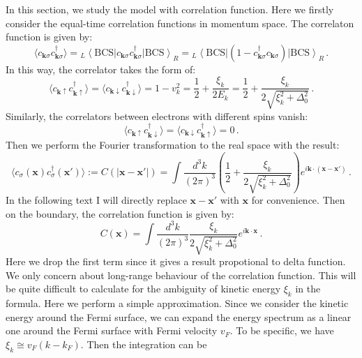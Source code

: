 \documentclass[aps,onecolumn,nofootinbib,superscriptaddress,notitlepage,longbibliography]{revtex4-1}
\begin{document}
In this section, we study the model with correlation function. Here
we firstly consider the equal-time correlation functions in momentum
space. The correlaton function is given by: 
\begin{equation}
\langle c_{\bm{k}\sigma}c_{\bm{k}\sigma}^{\dagger}\rangle={}_{L}\left\langle \text{BCS}\right|c_{\bm{k}\sigma}c_{\bm{k}\sigma}^{\dagger}\left|\text{BCS}\right\rangle _{R}={}_{L}\left\langle \text{BCS}\right|(1-c_{\bm{k}\sigma}^{\dagger}c_{\bm{k}\sigma})\left|\text{BCS}\right\rangle _{R}\,.
\end{equation}
In this way, the correlator takes the form of: 
\begin{equation}
\langle c_{\bm{k}\uparrow}c_{\bm{k}\uparrow}^{\dagger}\rangle=\langle c_{\bm{k}\downarrow}c_{\bm{k}\downarrow}^{\dagger}\rangle=1-v_{k}^{2}=\frac{1}{2}+\frac{\xi_{k}}{2E_{k}}=\frac{1}{2}+\frac{\xi_{k}}{2\sqrt{\xi_{k}^{2}+\Delta_{0}^{2}}}\,.
\end{equation}
Similarly, the correlators between electrons with different spins
vanish: 
\begin{equation}
\langle c_{\bm{k}\uparrow}c_{\bm{k}\downarrow}^{\dagger}\rangle=\langle c_{\bm{k}\downarrow}c_{\bm{k}\uparrow}^{\dagger}\rangle=0\,.
\end{equation}
Then we perform the Fourier transformation to the real space with
the result: 
\begin{equation}
\langle c_{\sigma}(\bm{x})c_{\sigma}^{\dagger}(\bm{x}')\rangle:=C(|\bm{x}-\bm{x}'|)=\int\frac{d^{3}k}{(2\pi)^{3}}\left(\frac{1}{2}+\frac{\xi_{k}}{2\sqrt{\xi_{k}^{2}+\Delta_{0}^{2}}}\right)e^{i\bm{k}\cdot(\bm{x}-\bm{x}')}\,.
\end{equation}
In the following text I will directly replace $\bm{x}-\bm{x}'$ with
$\bm{x}$ for convenience. Then on the boundary, the correlation function
is given by: 
\begin{equation}
C(\bm{x})=\int\frac{d^{3}k}{(2\pi)^{3}}\frac{\xi_{k}}{2\sqrt{\xi_{k}^{2}+\Delta_{0}^{2}}}e^{i\bm{k}\cdot\bm{x}}\,.
\end{equation}
Here we drop the first term since it gives a result propotional to
delta function. We only concern about long-range behaviour of the
correlation function. This will be quite difficult to calculate for
the ambiguity of kinetic energy $\xi_{k}$ in the formula. Here we
perform a simple approximation. Since we consider the kinetic energy
around the Fermi surface, we can expand the energy spectrum as a linear
one around the Fermi surface with Fermi velocity $v_{F}$. To be specific,
we have $\xi_{k}\cong v_{F}(k-k_{F})$. Then the integration can be
\end{document}
